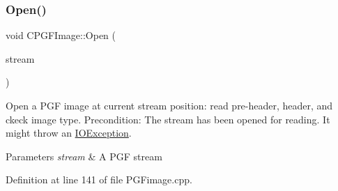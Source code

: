 \subsubsection{\texorpdfstring{Open()}{Open()}}
{\footnotesize\ttfamily void C\+P\+G\+F\+Image\+::\+Open (\begin{DoxyParamCaption}\item[{\mbox{\hyperlink{classCPGFStream}{C\+P\+G\+F\+Stream}} $\ast$}]{stream }\end{DoxyParamCaption})}

Open a P\+GF image at current stream position\+: read pre-\/header, header, and ckeck image type. Precondition\+: The stream has been opened for reading. It might throw an \mbox{\hyperlink{structIOException}{I\+O\+Exception}}. 
\begin{DoxyParams}{Parameters}
{\em stream} & A P\+GF stream \\
\hline
\end{DoxyParams}


Definition at line 141 of file P\+G\+Fimage.\+cpp.


